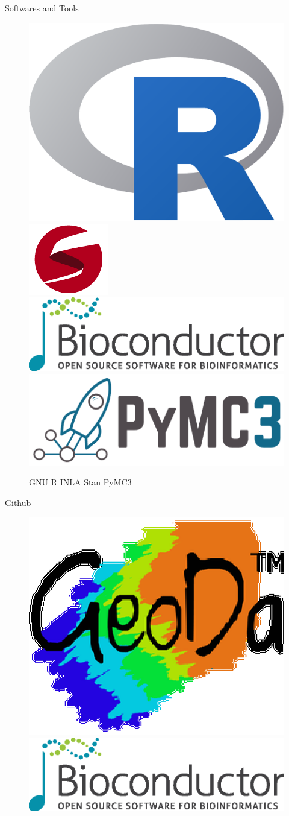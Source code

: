 \documentclass[9pt,compress,xcolor=x11names,UTF8]{beamer}
\begin{document}
\begin{frame}{Softwares and Tools}
\begin{figure}

\centering
\includegraphics[width=.2\textwidth]{software/r}\qquad
\includegraphics[width=.16\textwidth]{software/stan} \\ 
\includegraphics[width=.45\textwidth]{software/bioconductor}
\includegraphics[width=.45\textwidth]{software/PyMC3} 
\caption{{\color{OrangeRed1} GNU R} {\color{SpringGreen4} INLA}  {\color{OrangeRed1} Stan} {\color{SpringGreen4} PyMC3}}

\end{figure}
\end{frame}



\begin{frame}{Github}

\begin{figure}
\centering
\includegraphics[width=.3\textwidth]{software/GeoDa}\\
\includegraphics[width=.8\textwidth]{software/bioconductor}
\end{figure}

\end{frame}
\end{document}
